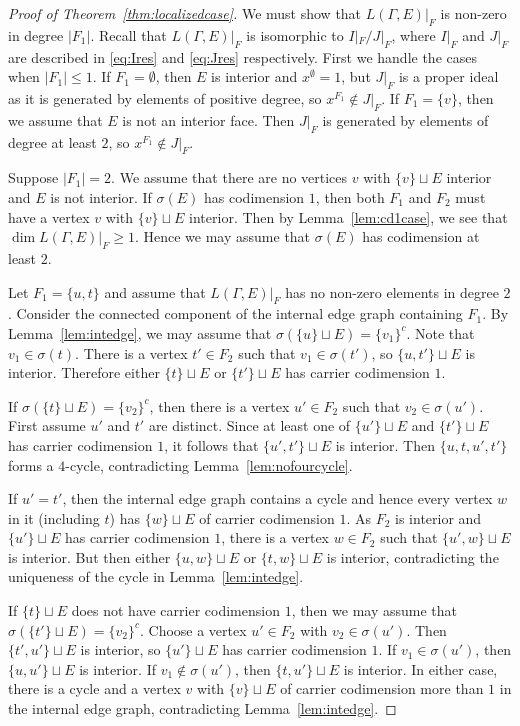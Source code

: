 \begin{proof}[Proof of Theorem~\ref{thm:localizedcase}]
We must show that $L(\Gamma, E)|_{F}$ is non-zero in degree $|F_1|$. 
Recall that $L(\Gamma, E)|_{F}$ is isomorphic to $I|_{F}/J|_{F}$, where $I|_{F}$ and $J|_{F}$ are described in \eqref{eq:Ires} and \eqref{eq:Jres} respectively. First we handle the cases when $\vert F_1 \vert \le 1$. If $F_1 = \emptyset$, then $E$ is interior and $x^{\emptyset} = 1$, but $J|_{F}$ is a proper ideal as it is generated by elements of positive degree, so $x^{F_1} \not \in J|_{F}$. If $F_1 = \{v\}$, then we assume that $E$ is not an interior face. Then $J|_{F}$ is generated by elements of degree at least $2$, so $x^{F_1} \not \in J|_{F}$.

Suppose $\vert F_1 \vert = 2$. We assume that there are no vertices $v$ with $\{v\} \sqcup E$ interior and $E$ is not interior. If $\sigma(E)$ has codimension $1$, then both $F_1$ and $F_2$ must have a vertex $v$ with $\{v\} \sqcup E$ interior. Then by Lemma~\ref{lem:cd1case}, we see that $\dim L(\Gamma, E)|_{F} \ge 1$. Hence we may assume that $\sigma(E)$ has codimension at least $2$.

Let $F_1 = \{u, t\}$ and assume that $L(\Gamma, E)|_{F}$ has no non-zero elements in degree $2$. Consider the connected component of the internal edge graph containing $F_1$. By Lemma~\ref{lem:intedge}, we may assume that $\sigma(\{u\} \sqcup E) = \{v_1\}^c$. Note that $v_1 \in \sigma(t)$. There is a vertex $t' \in F_2$ such that $v_1 \in \sigma(t')$, so $\{u, t'\} \sqcup E$ is interior. Therefore either $\{t\} \sqcup E$ or $\{t'\} \sqcup E$ has carrier codimension $1$. 

If $\sigma(\{t\} \sqcup E) = \{v_2\}^c$, then there is a vertex $u' \in F_2$ such that $v_2 \in \sigma(u')$. First assume $u'$ and $t'$ are distinct. Since at least one of $\{u'\} \sqcup E$ and $\{t'\} \sqcup E$ has carrier codimension $1$, it follows that $\{ u', t'\} \sqcup E$ is interior. Then $\{u, t, u', t'\}$ forms a $4$-cycle, contradicting Lemma~\ref{lem:nofourcycle}.

If $u' = t'$, then the internal edge graph contains a cycle and hence every vertex $w$ in it (including $t$) has $\{w\} \sqcup E$ of carrier codimension $1$. As $F_2$ is interior and $\{u'\} \sqcup E$ has carrier codimension $1$, there is a vertex $w \in F_2$ such that $\{u', w\} \sqcup E$ is interior. But then either $\{u, w\} \sqcup E$ or $\{t, w\} \sqcup E$ is interior, contradicting the uniqueness of the cycle in Lemma~\ref{lem:intedge}.

If $\{t\} \sqcup E$ does not have carrier codimension $1$, then we may assume that $\sigma(\{t'\} \sqcup E) = \{v_2\}^c$. Choose a vertex $u' \in F_2$ with $v_2 \in \sigma(u')$. Then $\{t', u'\} \sqcup E$ is interior, so $\{u'\} \sqcup E$ has carrier codimension $1$. If $v_1 \in \sigma(u')$, then $\{u, u'\} \sqcup E$ is interior. If $v_1 \not \in \sigma(u')$, then $\{t, u'\} \sqcup E$ is interior. In either case, there is a cycle and a vertex $v$ with $\{v\} \sqcup E$ of carrier codimension more than $1$ in the internal edge graph, contradicting Lemma~\ref{lem:intedge}. 
\end{proof}
